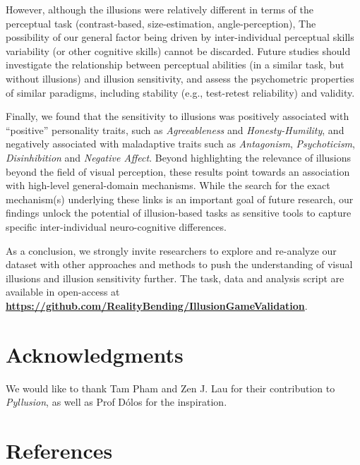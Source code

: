 \documentclass[
  man,floatsintext]{apa6}
\begin{document}
However, although the illusions were relatively different in terms of the perceptual task (contrast-based, size-estimation, angle-perception), The possibility of our general factor being driven by inter-individual perceptual skills variability (or other cognitive skills) cannot be discarded. Future studies should investigate the relationship between perceptual abilities (in a similar task, but without illusions) and illusion sensitivity, and assess the psychometric properties of similar paradigms, including stability (e.g., test-retest reliability) and validity.

Finally, we found that the sensitivity to illusions was positively associated with ``positive'' personality traits, such as \emph{Agreeableness} and \emph{Honesty-Humility}, and negatively associated with maladaptive traits such as \emph{Antagonism}, \emph{Psychoticism}, \emph{Disinhibition} and \emph{Negative Affect}. Beyond highlighting the relevance of illusions beyond the field of visual perception, these results point towards an association with high-level general-domain mechanisms. While the search for the exact mechanism(s) underlying these links is an important goal of future research, our findings unlock the potential of illusion-based tasks as sensitive tools to capture specific inter-individual neuro-cognitive differences.

As a conclusion, we strongly invite researchers to explore and re-analyze our dataset with other approaches and methods to push the understanding of visual illusions and illusion sensitivity further. The task, data and analysis script are available in open-access at \href{https://github.com/RealityBending/IllusionGameValidation}{\textbf{https://github.com/RealityBending/IllusionGameValidation}}.

\hypertarget{acknowledgments}{%
\section{Acknowledgments}\label{acknowledgments}}

We would like to thank Tam Pham and Zen J. Lau for their contribution to \emph{Pyllusion}, as well as Prof Dólos for the inspiration.

\newpage

\hypertarget{references}{%
\section{References}\label{references}}
\end{document}
